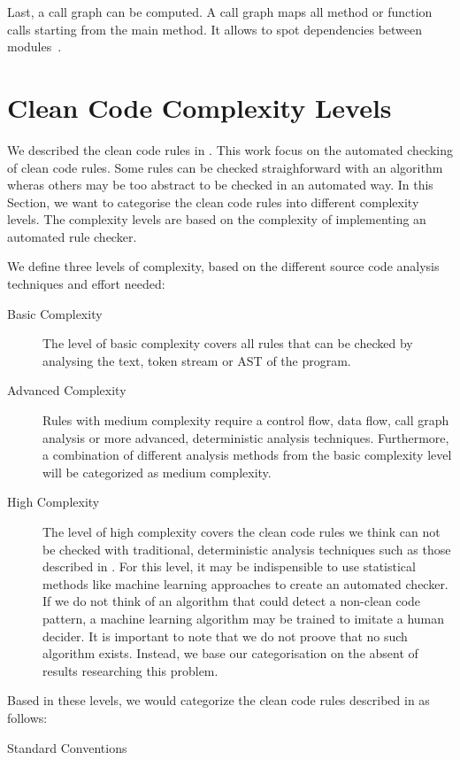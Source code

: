 Last, a call graph can be computed. A call graph maps all method or function calls starting from the main method. It allows to spot dependencies between modules~\cite{prahofer_static_2017}.

\section{Clean Code Complexity Levels}
We described the clean code rules in . This work focus on the automated checking of clean code rules. Some rules can be checked straighforward with an algorithm wheras others may be too abstract to be checked in an automated way. In this Section, we want to categorise the clean code rules into different complexity levels. The complexity levels are based on the complexity of implementing an automated rule checker. 

We define three levels of complexity, based on the different source code analysis techniques and effort needed:
\begin{description}
    \item[Basic Complexity] The level of basic complexity covers all rules that can be checked by analysing the text, token stream or AST of the program.
    \item[Advanced Complexity] Rules with medium complexity require a control flow, data flow, call graph analysis or more advanced, deterministic analysis techniques. Furthermore, a combination of different analysis methods from the basic complexity level will be categorized as medium complexity. 
    \item[High Complexity] The level of high complexity covers the clean code rules we think can not be checked with traditional, deterministic analysis techniques such as those described in . For this level, it may be indispensible to use statistical methods like machine learning approaches to create an automated checker. If we do not think of an algorithm that could detect a non-clean code pattern, a machine learning algorithm may be trained to imitate a human decider. It is important to note that we do not proove that no such algorithm exists. Instead, we base our categorisation on the absent of results researching this problem. 
\end{description}

Based in these levels, we would categorize the clean code rules described in  as follows:
\begin{description}
    \item[Standard Conventions] 
\end{description}
 

